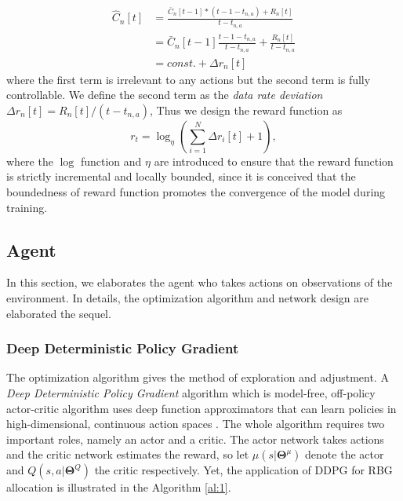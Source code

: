 \documentclass[conference,compsocconf]{IEEEtran}
\begin{document}
\begin{equation}
\begin{aligned}
\hat{C}_n[t]&=\frac{\bar{C}_n[t-1]*(t-1-t_{n,a})+R_n[t]}{t-t_{n,a}}\\
&=\bar{C}_n[t-1]\frac{t-1-t_{n,a}}{t-t_{n,a}}+\frac{R_n[t]}{t-t_{n,a}}\\
&=const.+\Delta r_n[t]
\end{aligned}
\end{equation}
where the first term is irrelevant to any actions but the second term is fully controllable. We define the second term as the \textit{data rate deviation} $\Delta r_n[t]=R_n[t]/(t-t_{n,a})$, Thus we design the reward function as
\begin{equation}
r_t = \log_{\eta} \left(\sum_{i=1}^{N}\Delta r_i[t]+1\right),
\end{equation}
where the $\log$ function and $\eta$ are introduced to ensure that the reward function is strictly incremental and locally bounded, since it is conceived that the boundedness of reward function promotes the convergence of the model during training.

\subsection{Agent}
In this section, we elaborates the agent who takes actions on observations of the environment. In details, the optimization algorithm and network design are elaborated the sequel.
\subsubsection{Deep Deterministic Policy Gradient}
The optimization algorithm gives the method of exploration and adjustment. A \textit{Deep Deterministic Policy Gradient} algorithm which is model-free, off-policy actor-critic algorithm uses deep function approximators that can learn policies in high-dimensional, continuous action spaces
\cite{Lillicrap2015Continuous}. The whole algorithm requires two important roles, namely an actor and a critic. The actor network takes actions and the critic network estimates the reward, so let $ \mu (s|\mathbf{\Theta}^{\mu})$ denote the actor and $ Q (s,a|\mathbf{\Theta}^{Q})$ the critic respectively. Yet,
the application of DDPG for RBG allocation is illustrated in the Algorithm \ref{al:1}.
\end{document}
